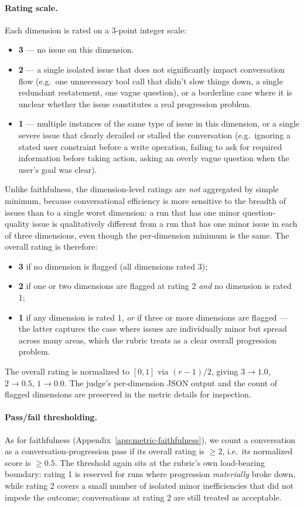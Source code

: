 \paragraph{Rating scale.} Each dimension is rated on a 3-point integer scale:
\begin{itemize}
    \item \textbf{3} --- no issue on this dimension.
    \item \textbf{2} --- a single isolated issue that does not significantly impact conversation flow (e.g.\ one unnecessary tool call that didn't slow things down, a single redundant restatement, one vague question), or a borderline case where it is unclear whether the issue constitutes a real progression problem.
    \item \textbf{1} --- multiple instances of the same type of issue in this dimension, or a single severe issue that clearly derailed or stalled the conversation (e.g.\ ignoring a stated user constraint before a write operation, failing to ask for required information before taking action, asking an overly vague question when the user's goal was clear).
\end{itemize}
Unlike faithfulness, the dimension-level ratings are \emph{not} aggregated by simple minimum, because conversational efficiency is more sensitive to the breadth of issues than to a single worst dimension: a run that has one minor question-quality issue is qualitatively different from a run that has one minor issue in each of three dimensions, even though the per-dimension minimum is the same. The overall rating is therefore:
\begin{itemize}
    \item \textbf{3} if no dimension is flagged (all dimensions rated 3);
    \item \textbf{2} if one or two dimensions are flagged at rating 2 \emph{and} no dimension is rated 1;
    \item \textbf{1} if any dimension is rated 1, \emph{or} if three or more dimensions are flagged --- the latter captures the case where issues are individually minor but spread across many areas, which the rubric treats as a clear overall progression problem.
\end{itemize}
The overall rating is normalized to $[0, 1]$ via $(r - 1)/2$, giving $3 \to 1.0$, $2 \to 0.5$, $1 \to 0.0$. The judge's per-dimension JSON output and the count of flagged dimensions are preserved in the metric details for inspection.

\paragraph{Pass/fail thresholding.} As for faithfulness (Appendix~\ref{app:metric-faithfulness}), we count a conversation as a conversation-progression pass if its overall rating is $\geq 2$, i.e.\ its normalized score is $\geq 0.5$. The threshold again sits at the rubric's own load-bearing boundary: rating 1 is reserved for runs where progression \emph{materially} broke down, while rating 2 covers a small number of isolated minor inefficiencies that did not impede the outcome; conversations at rating 2 are still treated as acceptable.

